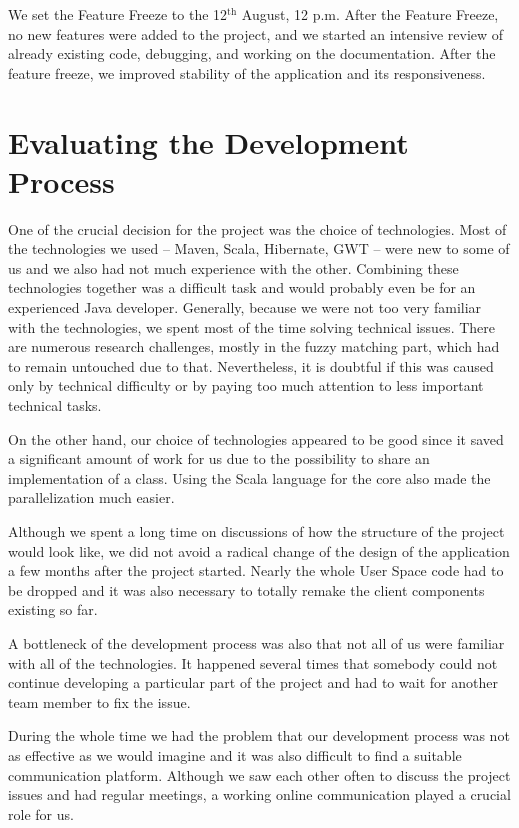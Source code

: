 {We set the Feature Freeze to the 12$^\mathrm{th}$ August, 12 p.m.
After the Feature Freeze, no new features were added to the project, and 
we started an intensive review of already existing code, debugging, and 
working on the documentation. After the feature freeze, we improved 
stability of the application and its responsiveness. 


\section{Evaluating the Development Process}

One of the crucial decision for the project was the choice of technologies. Most of the technologies we used -- Maven, Scala, Hibernate, GWT -- were new to some of us and we also had not much experience with the other. Combining these technologies together was a difficult task and would probably even be for an experienced Java developer. Generally, because we were not too very familiar with the technologies, we spent most of the time solving technical issues. There are numerous research challenges, mostly in the fuzzy matching part, which had to remain untouched due to that. Nevertheless, it is doubtful if this was caused only by technical difficulty or by paying too much attention to less important technical tasks.

On the other hand, our choice of technologies appeared to be good since it saved a significant amount of work for us due to the possibility to share an implementation of a class. Using the Scala language for the core also made the parallelization much easier.

Although we spent a long time on discussions of how the structure of the project would look like, we did not avoid a radical change of the design of the application a few months after the project started. Nearly the whole User Space code had to be dropped and it was also necessary to totally remake the client components existing so far.

A bottleneck of the development process was also that not all of us were familiar with all of the technologies. It happened several times that somebody could not continue developing a particular part of the project and had to wait for another team member to fix the issue.

During the whole time we had the problem that our development process was not as effective as we would imagine and it was also difficult to find a suitable communication platform. Although we saw each other often to discuss the project issues and had regular meetings, a working online communication played a crucial role for us.

}
